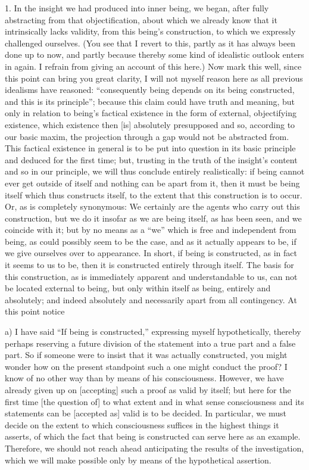 1. In the insight we had produced into inner being,
we began, after fully abstracting from that objectification,
about which we already know that it intrinsically lacks validity,
from this being's construction,
to which we expressly challenged ourselves.
(You see that I revert to this,
partly as it has always been done up to now,
and partly because thereby some kind of
idealistic outlook enters in again.
I refrain from giving an account of this here.)
Now mark this well, since this point can bring you great clarity,
I will not myself reason here as all previous idealisms have reasoned:
“consequently being depends on its being constructed,
and this is its principle”;
because this claim could have truth and meaning,
but only in relation to being's factical existence
in the form of external, objectifying existence,
which existence then [is] absolutely presupposed
and so, according to our basic maxim,
the projection through a gap would not be abstracted from.
This factical existence in general is to be put into question
in its basic principle and deduced for the first time;
but, trusting in the truth of the insight's content
and so in our principle,
we will thus conclude entirely realistically:
if being cannot ever get outside of itself
and nothing can be apart from it,
then it must be being itself
which thus constructs itself,
to the extent that this construction is to occur.
Or, as is completely synonymous:
We certainly are the agents who carry out this construction,
but we do it insofar as we are being itself,
as has been seen, and we coincide with it;
but by no means as a “we” which
is free and independent from being,
as could possibly seem to be the case,
and as it actually appears to be,
if we give ourselves over to appearance.
In short, if being is constructed,
as in fact it seems to us to be,
then it is constructed entirely through itself.
The basis for this construction,
as is immediately apparent and understandable to us,
can not be located external to being,
but only within itself as being, entirely and absolutely;
and indeed absolutely and necessarily
apart from all contingency.
At this point notice

a) I have said “If being is constructed,”
expressing myself hypothetically,
thereby perhaps reserving a future division
of the statement into a true part and a false part.
So if someone were to insist that it was actually constructed,
you might wonder how on the present standpoint
such a one might conduct the proof?
I know of no other way than by means of his consciousness.
However, we have already given up on [accepting]
such a proof as valid by itself;
but here for the first time [the question of]
to what extent and in what sense
consciousness and its statements
can be [accepted as] valid is to be decided.
In particular, we must decide on the extent
to which consciousness suffices
in the highest things it asserts,
of which the fact that being is constructed
can serve here as an example.
Therefore, we should not reach ahead
anticipating the results of the investigation,
which we will make possible only by means of
the hypothetical assertion.

